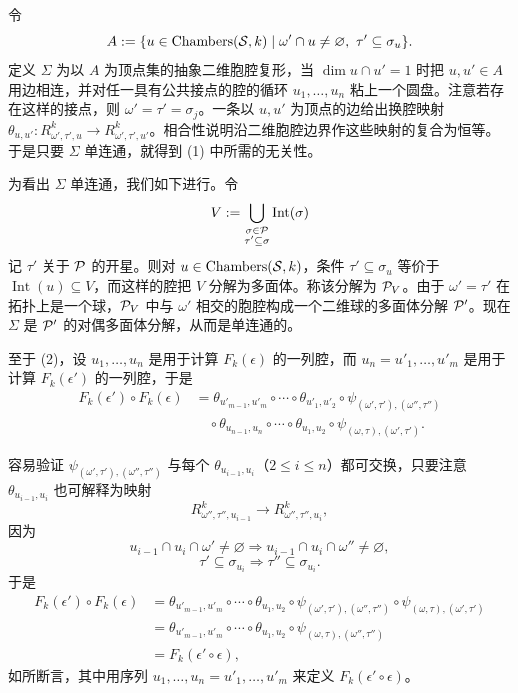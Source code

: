 令
\[
  A:=\{u\in\operatorname{Chambers}(\mathcal{S},k)\mid \omega'\cap u\ne\varnothing,\ \tau'\subseteq\sigma_u\}.
\]
定义 $\Sigma$ 为以 $A$ 为顶点集的抽象二维胞腔复形，当 $\dim u\cap u'=1$ 时把 $u,u'\in A$ 用边相连，并对任一具有公共接点的腔的循环 $u_1,\ldots,u_n$ 粘上一个圆盘。注意若存在这样的接点，则 $\omega'=\tau'=\sigma_j$。一条以 $u,u'$ 为顶点的边给出换腔映射 $\theta_{u,u'}:R^k_{\omega',\tau',u}\to R^k_{\omega',\tau',u'}$。相合性说明沿二维胞腔边界作这些映射的复合为恒等。于是只要 $\Sigma$ 单连通，就得到 (1) 中所需的无关性。

为看出 $\Sigma$ 单连通，我们如下进行。令
\[
  V:=\bigcup_{\substack{\sigma\in\mathcal{P}\\ \tau'\subseteq\sigma}}\operatorname{Int}(\sigma)
\]
记 $\tau'$ 关于 $\mathcal{P}$ 的开星。则对 $u\in\operatorname{Chambers}(\mathcal{S},k)$，条件 $\tau'\subseteq\sigma_u$ 等价于 $\operatorname{Int}(u)\subseteq V$，而这样的腔把 $V$ 分解为多面体。称该分解为 $\mathcal{P}_V$。由于 $\omega'=\tau'$ 在拓扑上是一个球，$\mathcal{P}_V$ 中与 $\omega'$ 相交的胞腔构成一个二维球的多面体分解 $\mathcal{P}'$。现在 $\Sigma$ 是 $\mathcal{P}'$ 的对偶多面体分解，从而是单连通的。

至于 (2)，设 $u_1,\ldots,u_n$ 是用于计算 $F_k(\epsilon)$ 的一列腔，而 $u_n=u'_1,\ldots,u'_m$ 是用于计算 $F_k(\epsilon')$ 的一列腔，于是
\[
  \begin{aligned}
    F_k(\epsilon')\circ F_k(\epsilon)
    &=\theta_{u'_{m-1},u'_m}\circ\cdots\circ\theta_{u'_1,u'_2}
    \circ\psi_{(\omega',\tau'),(\omega'',\tau'')}\\
    &\quad\circ\theta_{u_{n-1},u_n}\circ\cdots\circ\theta_{u_1,u_2}
    \circ\psi_{(\omega,\tau),(\omega',\tau')}.
  \end{aligned}
\]


容易验证 $\psi_{(\omega',\tau'),(\omega'',\tau'')}$ 与每个 $\theta_{u_{i-1},u_i}$（$2\le i\le n$）都可交换，只要注意 $\theta_{u_{i-1},u_i}$ 也可解释为映射
\[
  R^k_{\omega'',\tau'',u_{i-1}}\to R^k_{\omega'',\tau'',u_i},
\]
因为
\[
  u_{i-1}\cap u_i\cap\omega'\ne\varnothing
  \Longrightarrow u_{i-1}\cap u_i\cap\omega''\ne\varnothing,
\]
\[
  \tau'\subseteq\sigma_{u_i}\Longrightarrow\tau''\subseteq\sigma_{u_i}.
\]
于是
\[
  \begin{aligned}
    F_k(\epsilon')\circ F_k(\epsilon)
    &=\theta_{u'_{m-1},u'_m}\circ\cdots\circ\theta_{u_1,u_2}
    \circ\psi_{(\omega',\tau'),(\omega'',\tau'')}\circ\psi_{(\omega,\tau),(\omega',\tau')}\\
    &=\theta_{u'_{m-1},u'_m}\circ\cdots\circ\theta_{u_1,u_2}
    \circ\psi_{(\omega,\tau),(\omega'',\tau'')}\\
    &=F_k(\epsilon'\circ\epsilon),
  \end{aligned}
\]
如所断言，其中用序列 $u_1,\ldots,u_n=u'_1,\ldots,u'_m$ 来定义 $F_k(\epsilon'\circ\epsilon)$。

